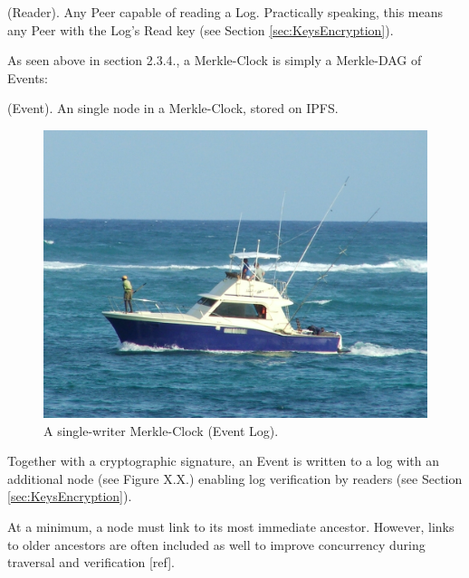 \documentclass{comjnl}
\begin{document}
\begin{definition}
(Reader). Any Peer capable of reading a Log. Practically speaking, this means any Peer with the Log’s Read key (see Section  \ref{sec:KeysEncryption}).
\end{definition}


As seen above in section 2.3.4., a Merkle-Clock is simply a Merkle-DAG of Events:

\begin{definition}
 (Event). An single node in a Merkle-Clock, stored on IPFS.
\end{definition}

\begin{figure}
  \includegraphics[width=\linewidth]{boat.jpg}
  \caption{A single-writer Merkle-Clock (Event Log).}
  \label{fig:boat1}
\end{figure}

Together with a cryptographic signature, an Event is written to a log with an additional node (see Figure X.X.) enabling log verification by readers (see Section  \ref{sec:KeysEncryption}).

At a minimum, a node must link to its most immediate ancestor. However, links to older ancestors are often included as well to improve concurrency during traversal and verification [ref].
\end{document}
